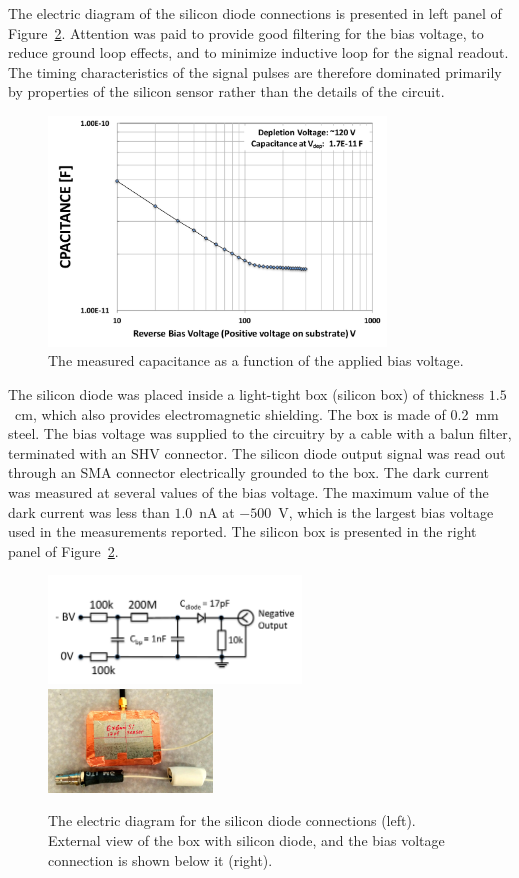 The electric diagram of the silicon
diode connections is presented in left panel of Figure~\ref{fig:SiliconPad}. Attention was
paid to provide good filtering for the bias voltage, to reduce ground loop effects, and
to minimize inductive loop for the signal readout. The timing characteristics
of the signal pulses are therefore dominated primarily by properties of the
silicon sensor rather than the details of the circuit.
\begin{figure}[h] 
\centering
\includegraphics[width=0.8\textwidth]{plots/SiliconDiodeCV_v3.pdf} 
\caption{The measured capacitance as a function of the applied bias voltage.} 
\label{fig:SiliconDiode} 
\end{figure} 
The silicon diode was placed inside a light-tight box (silicon box) of thickness $1.5$~cm,
which also provides electromagnetic shielding. The box is made of 0.2~mm steel.
The bias voltage was supplied to the circuitry by a cable with a balun filter,
terminated with an SHV connector. The silicon diode output signal was read out
through an SMA connector electrically grounded to the box. The dark current was
measured at several values of the bias voltage. The maximum value of the dark
current was less than $1.0$~nA at $-500$~V, which is the largest bias voltage
used in the measurements reported. The silicon box is
presented in the right panel of Figure~\ref{fig:SiliconPad}. 
\begin{figure}[h] 
\centering
\includegraphics[width=0.60\textwidth]{plots/SiliconDiodeDiagram.pdf} 
\includegraphics[width=0.39\textwidth]{plots/SiliconDiodeBox.jpg} 
\caption{The electric diagram for the silicon diode connections (left). External
view of the box with silicon diode, and the bias voltage connection is shown
below it (right).} 
\label{fig:SiliconPad} 
\end{figure} 
